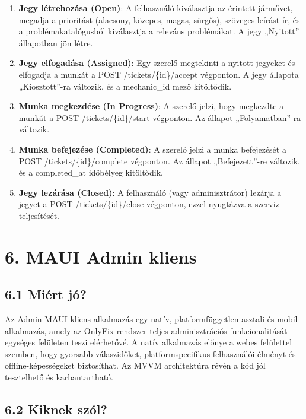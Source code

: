 \begin{enumerate}
\def\labelenumi{\arabic{enumi}.}
\item
  \textbf{Jegy létrehozása (Open)}: A felhasználó kiválasztja az érintett járművet, megadja a prioritást (alacsony, közepes, magas, sürgős), szöveges leírást ír, és a problémakatalógusból kiválasztja a releváns problémákat. A jegy „Nyitott'' állapotban jön létre.
\item
  \textbf{Jegy elfogadása (Assigned)}: Egy szerelő megtekinti a nyitott jegyeket és elfogadja a munkát a POST /tickets/\{id\}/accept végponton. A jegy állapota „Kiosztott''-ra változik, és a mechanic\_id mező kitöltődik.
\item
  \textbf{Munka megkezdése (In Progress)}: A szerelő jelzi, hogy megkezdte a munkát a POST /tickets/\{id\}/start végponton. Az állapot „Folyamatban''-ra változik.
\item
  \textbf{Munka befejezése (Completed)}: A szerelő jelzi a munka befejezését a POST /tickets/\{id\}/complete végponton. Az állapot „Befejezett''-re változik, és a completed\_at időbélyeg kitöltődik.
\item
  \textbf{Jegy lezárása (Closed)}: A felhasználó (vagy adminisztrátor) lezárja a jegyet a POST /tickets/\{id\}/close végponton, ezzel nyugtázva a szerviz teljesítését.
\end{enumerate}

\protect{}\label{_Toc223012187}{}

\section{6. MAUI Admin kliens}\label{maui-admin-kliens}

\subsection{6.1 Miért jó?}\label{miuxe9rt-juxf3}

Az Admin MAUI kliens alkalmazás egy natív, platformfüggetlen asztali és mobil alkalmazás, amely az OnlyFix rendszer teljes adminisztrációs funkcionalitását egységes felületen teszi elérhetővé. A natív alkalmazás előnye a webes felülettel szemben, hogy gyorsabb válaszidőket, platformspecifikus felhasználói élményt és offline-képességeket biztosíthat. Az MVVM architektúra révén a kód jól tesztelhető és karbantartható.

\subsection{6.2 Kiknek szól?}\label{kiknek-szuxf3l}

